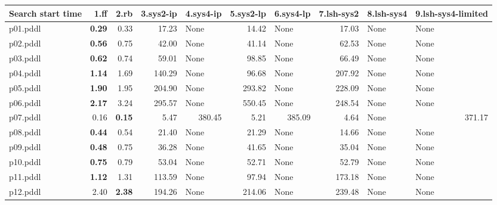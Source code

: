 \documentclass{article}
\begin{document}
\begin{tabular}{@{}lrrrrrrrrr@{}}
Search start time & 1.ff & 2.rb & 3.sys2-ip & 4.sys4-ip & 5.sys2-lp & 6.sys4-lp & 7.lsh-sys2 & 8.lsh-sys4 & 9.lsh-sys4-limited \\
\midrule
p01.pddl & \textbf{0.29} & 0.33 & 17.23 & \multicolumn{1}{|l|}{None} & 14.42 & \multicolumn{1}{|l|}{None} & 17.03 & \multicolumn{1}{|l|}{None} & \multicolumn{1}{|l|}{None} \\
p02.pddl & \textbf{0.56} & 0.75 & 42.00 & \multicolumn{1}{|l|}{None} & 41.14 & \multicolumn{1}{|l|}{None} & 62.53 & \multicolumn{1}{|l|}{None} & \multicolumn{1}{|l|}{None} \\
p03.pddl & \textbf{0.62} & 0.74 & 59.01 & \multicolumn{1}{|l|}{None} & 98.85 & \multicolumn{1}{|l|}{None} & 66.49 & \multicolumn{1}{|l|}{None} & \multicolumn{1}{|l|}{None} \\
p04.pddl & \textbf{1.14} & 1.69 & 140.29 & \multicolumn{1}{|l|}{None} & 96.68 & \multicolumn{1}{|l|}{None} & 207.92 & \multicolumn{1}{|l|}{None} & \multicolumn{1}{|l|}{None} \\
p05.pddl & \textbf{1.90} & 1.95 & 204.90 & \multicolumn{1}{|l|}{None} & 293.82 & \multicolumn{1}{|l|}{None} & 228.09 & \multicolumn{1}{|l|}{None} & \multicolumn{1}{|l|}{None} \\
p06.pddl & \textbf{2.17} & 3.24 & 295.57 & \multicolumn{1}{|l|}{None} & 550.45 & \multicolumn{1}{|l|}{None} & 248.54 & \multicolumn{1}{|l|}{None} & \multicolumn{1}{|l|}{None} \\
p07.pddl & 0.16 & \textbf{0.15} & 5.47 & 380.45 & 5.21 & 385.09 & 4.64 & \multicolumn{1}{|l|}{None} & 371.17 \\
p08.pddl & \textbf{0.44} & 0.54 & 21.40 & \multicolumn{1}{|l|}{None} & 21.29 & \multicolumn{1}{|l|}{None} & 14.66 & \multicolumn{1}{|l|}{None} & \multicolumn{1}{|l|}{None} \\
p09.pddl & \textbf{0.48} & 0.75 & 36.28 & \multicolumn{1}{|l|}{None} & 41.65 & \multicolumn{1}{|l|}{None} & 35.04 & \multicolumn{1}{|l|}{None} & \multicolumn{1}{|l|}{None} \\
p10.pddl & \textbf{0.75} & 0.79 & 53.04 & \multicolumn{1}{|l|}{None} & 52.71 & \multicolumn{1}{|l|}{None} & 52.79 & \multicolumn{1}{|l|}{None} & \multicolumn{1}{|l|}{None} \\
p11.pddl & \textbf{1.12} & 1.31 & 113.59 & \multicolumn{1}{|l|}{None} & 97.94 & \multicolumn{1}{|l|}{None} & 173.18 & \multicolumn{1}{|l|}{None} & \multicolumn{1}{|l|}{None} \\
p12.pddl & 2.40 & \textbf{2.38} & 194.26 & \multicolumn{1}{|l|}{None} & 214.06 & \multicolumn{1}{|l|}{None} & 239.48 & \multicolumn{1}{|l|}{None} & \multicolumn{1}{|l|}{None} \\

\end{tabular}
\end{document}
